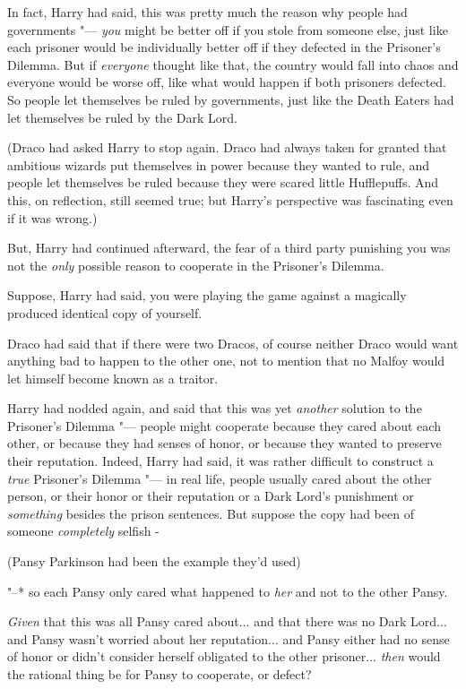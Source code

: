 In fact, Harry had said, this was pretty much the reason why people had
governments "--- \emph{you} might be better off if you stole from someone
else, just like each prisoner would be individually better off if they
defected in the Prisoner's Dilemma. But if \emph{everyone} thought like
that, the country would fall into chaos and everyone would be worse off,
like what would happen if both prisoners defected. So people let
themselves be ruled by governments, just like the Death Eaters had let
themselves be ruled by the Dark Lord.

(Draco had asked Harry to stop again. Draco had always taken for granted
that ambitious wizards put themselves in power because they wanted to
rule, and people let themselves be ruled because they were scared little
Hufflepuffs. And this, on reflection, still seemed true; but Harry's
perspective was fascinating even if it was wrong.)

But, Harry had continued afterward, the fear of a third party punishing
you was not the \emph{only} possible reason to cooperate in the
Prisoner's Dilemma.

Suppose, Harry had said, you were playing the game against a magically
produced identical copy of yourself.

Draco had said that if there were two Dracos, of course neither Draco
would want anything bad to happen to the other one, not to mention that
no Malfoy would let himself become known as a traitor.

Harry had nodded again, and said that this was yet \emph{another}
solution to the Prisoner's Dilemma "--- people might cooperate because they
cared about each other, or because they had senses of honor, or because
they wanted to preserve their reputation. Indeed, Harry had said, it was
rather difficult to construct a \emph{true} Prisoner's Dilemma "--- in real
life, people usually cared about the other person, or their honor or
their reputation or a Dark Lord's punishment or \emph{something} besides
the prison sentences. But suppose the copy had been of someone
\emph{completely} selfish -

(Pansy Parkinson had been the example they'd used)

"--* so each Pansy only cared what happened to \emph{her} and not to the
other Pansy.

\emph{Given} that this was all Pansy cared about... and that there
was no Dark Lord... and Pansy wasn't worried about her
reputation... and Pansy either had no sense of honor or didn't
consider herself obligated to the other prisoner... \emph{then}
would the rational thing be for Pansy to cooperate, or defect?

